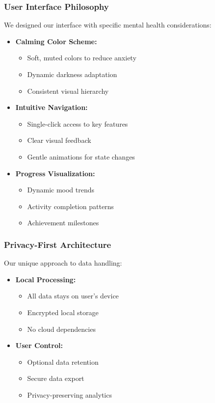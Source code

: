 \documentclass[12pt]{article}
\begin{document}
\subsubsection{User Interface Philosophy}
We designed our interface with specific mental health considerations:
\begin{itemize}
    \item \textbf{Calming Color Scheme:} 
    \begin{itemize}
        \item Soft, muted colors to reduce anxiety
        \item Dynamic darkness adaptation
        \item Consistent visual hierarchy
    \end{itemize}
    
    \item \textbf{Intuitive Navigation:}
    \begin{itemize}
        \item Single-click access to key features
        \item Clear visual feedback
        \item Gentle animations for state changes
    \end{itemize}
    
    \item \textbf{Progress Visualization:}
    \begin{itemize}
        \item Dynamic mood trends
        \item Activity completion patterns
        \item Achievement milestones
    \end{itemize}
\end{itemize}

\subsubsection{Privacy-First Architecture}
Our unique approach to data handling:
\begin{itemize}
    \item \textbf{Local Processing:}
    \begin{itemize}
        \item All data stays on user's device
        \item Encrypted local storage
        \item No cloud dependencies
    \end{itemize}
    
    \item \textbf{User Control:}
    \begin{itemize}
        \item Optional data retention
        \item Secure data export
        \item Privacy-preserving analytics
    \end{itemize}
\end{itemize}
\end{document}
